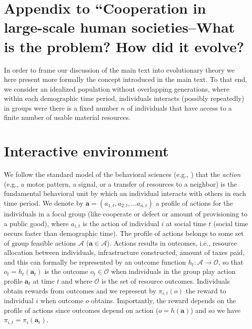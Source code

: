 \documentclass[12pt]{article}
\newcommand{\pa}{\pi}
\begin{document}
\section*{Appendix to ``Cooperation in large-scale human societies--What is the problem? How did it evolve?}

In order to frame our discussion of the main text into evolutionary theory we here present more formally the concept introduced in the main text. To that end, we consider an idealized population without overlapping generations, where within each demographic time period, individuals interacts (possibly repeatedly) in groups were there is a fixed number $n$ of individuals that have access to a finite number of usable material resources. 


\section*{Interactive environment}

We follow the standard model of the behavioral sciences (e.g., %
\citealp{McFarlandH81,RubinsteinO94,Haykin99,Leimar97,EnquistG05}) that 
 the \emph{action} (e.g., a motor pattern, a signal, or a transfer of resources to a neighbor) is the fundamental behavioral unit by which an individual interacts with
others in each time period. We denote by $\mathbf{a}=(a_{1,t},a_{2,t},...a_{n,t})$ a profile of actions for the individuals in a focal group (like cooperate or defect or amount of provisioning to a public good), where $a_{i,t}$ is the action of individual $i$ at social time $t$ (social time occurs faster than demographic time). The profile of actions belongs to some set of group feasible actions $\mathcal{A}$ ($\mathbf{a}\in \mathcal{A}$). Actions results in outcomes, i.e., resource allocation between individuals, infrastructure constructed, amount of taxes paid, and this can formally be represented by an outcome function $h_t:\mathcal{A}\to\mathcal{O}$, so that $o_t=h_t(\mathbf{a}_t)$ is the outcome $o_t \in \mathcal{O}$ when individuals in the group play action profile $\mathbf{a}_t$ at time $t$ and where $\mathcal{O}$ is the set of resource outcomes. Individuals obtain rewards from outcomes and we represent by $\pa_{i,t}(o)$ the reward to individual $i$ when outcome $o$ obtains. Importantly, the reward depends on the profile of actions since outcomes depend on action ($o=h(\mathbf{a})$) and so we have $\pa_{i,t}=\pa_i(\mathbf{a}_t)$. 
\end{document}

